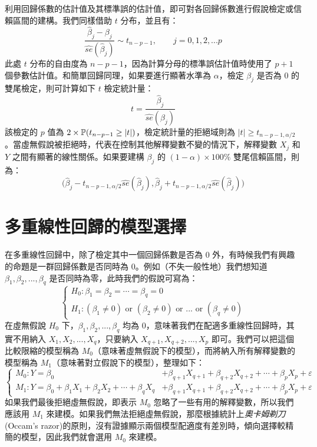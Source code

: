     \medskip

    利用回歸係數的估計值及其標準誤的估計值，即可對各回歸係數進行假說檢定或信賴區間的建構。我們同樣借助 $t$ 分布，並且有：
    \smallskip
    \[\frac{\hat{\beta}_j - \beta_j}{\widehat{se}(\hat{\beta}_j)} \sim t_{n-p-1}, \qquad j = 0,1,2,...p\]
    \smallskip
    此處 $t$ 分布的自由度為 $n-p-1$，因為計算分母的標準誤估計值時使用了 $p+1$ 個參數估計值。和簡單回歸同理，如果要進行顯著水準為 $\alpha$，檢定 $\beta_j$ 是否為 $0$ 的雙尾檢定，則可計算如下 $t$ 檢定統計量：
    \smallskip
    \[t = \frac{\hat{\beta}_j}{\widehat{se}(\hat{\beta}_j)}\]
    \smallskip
    該檢定的 $p$ 值為 $2\times\mathbb{P}(t_{n-p-1} \ge |t|)$，檢定統計量的拒絕域則為 $|t| \ge t_{n-p-1, \alpha/2}$。當虛無假說被拒絕時，代表在控制其他解釋變數不變的情況下，解釋變數 $X_j$ 和 $Y$ 之間有顯著的線性關係。如果要建構 $\beta_j$ 的 $(1-\alpha)\times 100\%$ 雙尾信賴區間，則為：
    \smallskip
    \[\Big(\hat{\beta}_j - t_{n-p-1, \alpha/2}\widehat{se}(\hat{\beta}_j), \hat{\beta}_j + t_{n-p-1, \alpha/2}\widehat{se}(\hat{\beta}_j)\Big)\]
    \smallskip
    
\section{多重線性回歸的模型選擇}
    在多重線性回歸中，除了檢定其中一個回歸係數是否為 $0$ 外，有時候我們有興趣的命題是一群回歸係數是否同時為 $0$。例如（不失一般性地）我們想知道 $\beta_1, \beta_2, ..., \beta_q$ 是否同時為零，此時我們的假說可寫為：
    \smallskip
    \[\left\{\begin{array}{l}
        H_0: \beta_1 = \beta_2 = \cdots = \beta_q = 0\\
        H_1: (\beta_1 \ne 0) \text{ or } (\beta_2 \ne 0) \text{ or } ... \text{ or } (\beta_q \ne 0)
    \end{array}\right.\]
    \smallskip
    在虛無假說 $H_0$ 下，$\beta_1, \beta_2, ..., \beta_q$ 均為 $0$，意味著我們在配適多重線性回歸時，其實不用納入 $X_1, X_2, ..., X_q$，只要納入 $X_{q+1}, X_{q+2}, ..., X_p$ 即可。我們可以把這個比較限縮的模型稱為 $M_0$（意味著虛無假說下的模型），而將納入所有解釋變數的模型稱為 $M_1$（意味著對立假說下的模型），整理如下：
    \smallskip
    \[\left\{\begin{array}{ll}
        M_0: Y = \beta_0  &+ \beta_{q+1} X_{q+1} + \beta_{q+2} X_{q+2} + \cdots + \beta_{p} X_{p} + \varepsilon\\
        M_1: Y = \beta_0 + \beta_1 X_1 + \beta_2 X_2 + \cdots  + \beta_q X_q &+ \beta_{q+1} X_{q+1} + \beta_{q+2} X_{q+2} + \cdots + \beta_{p} X_{p} + \varepsilon
    \end{array}\right.\]
    \smallskip
    如果我們最後拒絕虛無假說，即表示 $M_0$ 忽略了一些有用的解釋變數，所以我們應該用 $M_1$ 來建模。如果我們無法拒絕虛無假說，那麼根據統計上\textit{奧卡姆剃刀} (Occam's razor)的原則，沒有證據顯示兩個模型配適度有差別時，傾向選擇較精簡的模型，因此我們就會選用 $M_0$ 來建模。

